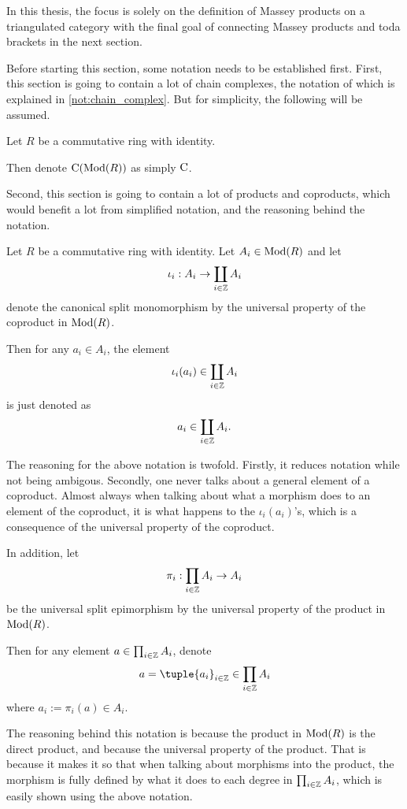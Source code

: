 In this thesis, the focus is solely on the definition of Massey products on a triangulated category with the final goal of connecting Massey products and toda brackets in the next section.

Before starting this section, some notation needs to be established first. First, this section is going to contain a lot of chain complexes, the notation of which is explained in \autoref{not:chain_complex}. But for simplicity, the following will be assumed.
\begin{notation}
    Let \( R \) be a commutative ring with identity.

    Then denote \( \operatorname{C}(\operatorname{Mod}(R)) \) as simply \( \operatorname{C} \).
\end{notation}

Second, this section is going to contain a lot of products and coproducts, which would benefit a lot from simplified notation, and the reasoning behind the notation.

\begin{notation}
    Let \( R \) be a commutative ring with identity. Let \( A_i \in \operatorname{Mod}(R) \) and let
    \[
        \iota_i: A_i \to \coprod_{i \in {\mathbb{Z}}} A_i
    \]
    denote the canonical split monomorphism by the universal property of the coproduct in \( \operatorname{Mod}(R) \).

    Then for any \( a_i \in A_i \), the element
    \[
        \iota_i(a_i) \in \coprod_{i \in {\mathbb{Z}}} A_i
    \]
    is just denoted as
    \[
        a_i \in \coprod_{i \in {\mathbb{Z}}} A_i.
    \]
    
    The reasoning for the above notation is twofold. Firstly, it reduces notation while not being ambigous. Secondly, one never talks about a general element of a coproduct. Almost always when talking about what a morphism does to an element of the coproduct, it is what happens to the \( \iota_i(a_i) \)'s, which is a consequence of the universal property of the coproduct.

    In addition, let 
    \[
        \pi_i: \prod_{i \in {\mathbb{Z}}} A_i \to A_i
    \]
    be the universal split epimorphism by the universal property of the product in \( \operatorname{Mod}(R) \).
    
    Then for any element \( a \in \prod_{i \in {\mathbb{Z}}} A_i \), denote
    \[
        a = \tuple{a_i}_{i \in \Zb} \in \prod_{i \in \Zb} A_i
    \]
    where \( a_i := \pi_i(a) \in A_i \).
    
    The reasoning behind this notation is because the product in \( \operatorname{Mod}(R) \) is the direct product, and because the universal property of the product. That is because it makes it so that when talking about morphisms into the product, the morphism is fully defined by what it does to each degree in \( \prod_{i \in {\mathbb{Z}}} A_i \), which is easily shown using the above notation.
\end{notation}

